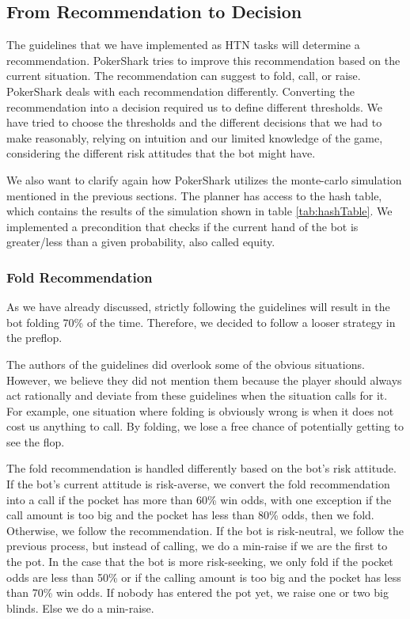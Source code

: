 \subsection{From Recommendation to Decision}

The guidelines that we have implemented as HTN tasks will determine a recommendation. PokerShark tries to improve this recommendation based on the current situation. The recommendation can suggest to fold, call, or raise. PokerShark deals with each recommendation differently. Converting the recommendation into a decision required us to define different thresholds. We have tried to choose the thresholds and the different decisions that we had to make reasonably, relying on intuition and our limited knowledge of the game, considering the different risk attitudes that the bot might have.

We also want to clarify again how PokerShark utilizes the monte-carlo simulation mentioned in the previous sections. The planner has access to the hash table, which contains the results of the simulation shown in table \ref{tab:hashTable}. We implemented a precondition that checks if the current hand of the bot is greater/less than a given probability, also called equity.

\subsubsection{Fold Recommendation}

As we have already discussed, strictly following the guidelines will result in the bot folding 70\% of the time. Therefore, we decided to follow a looser strategy in the preflop.

The authors of the guidelines did overlook some of the obvious situations. However, we believe they did not mention them because the player should always act rationally and deviate from these guidelines when the situation calls for it. For example, one situation where folding is obviously wrong is when it does not cost us anything to call. By folding, we lose a free chance of potentially getting to see the flop.

The fold recommendation is handled differently based on the bot's risk attitude. If the bot's current attitude is risk-averse, we convert the fold recommendation into a call if the pocket has more than 60\% win odds, with one exception if the call amount is too big and the pocket has less than 80\% odds, then we fold. Otherwise, we follow the recommendation.
If the bot is risk-neutral, we follow the previous process, but instead of calling, we do a min-raise if we are the first to the pot.
In the case that the bot is more risk-seeking, we only fold if the pocket odds are less than 50\% or if the calling amount is too big and the pocket has less than 70\% win odds. If nobody has entered the pot yet, we raise one or two big blinds. Else we do a min-raise.


